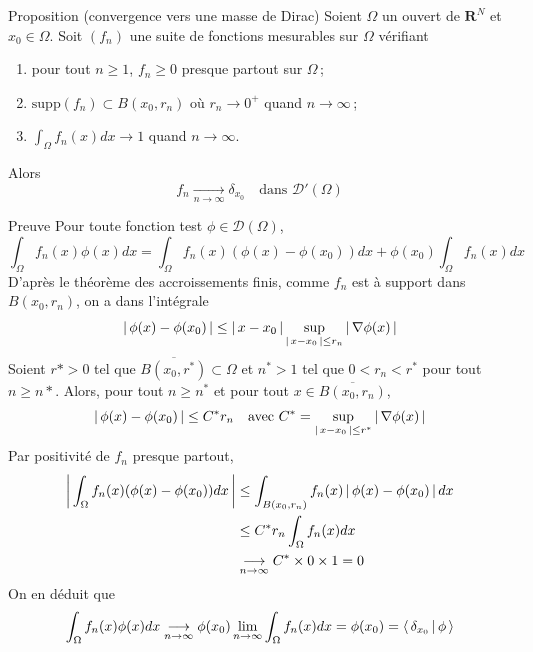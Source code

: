         \begin{omed}{Proposition (convergence vers une masse de Dirac)}
            Soient $\Omega$ un ouvert de $\mathbf{R}^N$ et $x_0 \in \Omega$. Soit $(f_n)$ une suite de fonctions mesurables sur $\Omega$ vérifiant 
            \begin{enumerate}[label=($h_{\arabic*}$)]
                \item pour tout $n \geq 1$, $f_n \geq 0$ presque partout sur $\Omega$ ;
                \item $\text{supp}(f_n) \subset B(x_0, r_n)$ où $r_n \to 0^+$ quand $n \to \infty$ ;
                \item $\int_{\Omega} f_n(x)dx \to 1$ quand $n \to \infty$.
            \end{enumerate}
            Alors 
            \[ f_n \underset{n \to \infty}{\longrightarrow} \delta_{x_0} \quad \text{dans } \mathcal{D}'(\Omega) \]   
        \end{omed}

        \begin{demo}{Preuve}
            Pour toute fonction test $\phi \in \mathcal{D}(\Omega)$, 
            \[ \int_{\Omega} f_n(x)\phi(x)dx = \int_{\Omega} f_n(x)(\phi(x) - \phi(x_0)) dx + \phi(x_0) \int_{\Omega} f_n(x)dx \]    
            D’après le théorème des accroissements finis, comme $f_n$ est à support dans $B(x_0, r_n)$, on a dans l’intégrale
            \[ \left\lvert \, \phi(x) - \phi(x_0) \, \right\rvert \leq \left\lvert \, x - x_0 \, \right\rvert \sup_{\left\lvert \, x - x_0 \, \right\rvert \leq r_n} \left\lvert \, \nabla \phi(x) \, \right\rvert \]   
            Soient $r* > 0$ tel que $\overline{B(x_0, r^*)} \subset \Omega$ et $n^* > 1$ tel que $0 < r_n < r^{*}$ pour tout $n \geq n*$. Alors, pour tout $n \geq n^*$ et pour tout $x \in \overline{B(x_0, r_n)}$,
            \[ \left\lvert \, \phi(x) - \phi(x_0) \, \right\rvert \leq C^* r_n \quad \text{avec } C^* = \sup_{\left\lvert \, x - x_0 \, \right\rvert \leq r^*} \left\lvert \, \nabla \phi(x) \, \right\rvert \]
            Par positivité de $f_n$ presque partout, 
            \begin{align*}
                \left\lvert \, \int_{\Omega} f_n(x)(\phi(x) - \phi(x_0))dx \, \right\rvert 
                &\leq \int_{B(x_0,r_n)} f_n(x) \left\lvert \, \phi(x) - \phi(x_0) \, \right\rvert dx \\
                &\leq C^* r_n \int_{\Omega} f_n(x)dx \\
                &\underset{n \to \infty}{\longrightarrow} C^* \times 0 \times 1 =  0
            \end{align*}
            On en déduit que 
            \[ \int_{\Omega} f_n(x) \phi(x) dx \underset{n \to \infty}{\longrightarrow} \phi(x_0) \lim_{n \to \infty} \int_{\Omega} f_n(x)dx = \phi(x_0) = \left< \, \delta_{x_0} \, \middle| \, \phi \, \right> \]   
        \end{demo}

